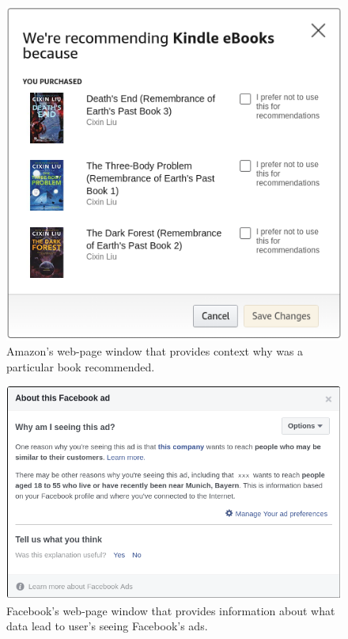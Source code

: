 \begin{figure}[htbp]
    \centering
    \includegraphics[scale=0.5]{img/AmazonExplanation.png}
    \caption{Amazon's web-page window that provides context why was a particular book recommended.}
    \label{fig:amazon_explain_book_recommendation}
\end{figure}

\begin{figure}[htbp]
    \centering
    \includegraphics[scale=0.5]{img/FacebookAdExplanation2.png}
    \caption{Facebook's web-page window that provides information about what data lead to user's seeing Facebook's ads.}
    \label{fig:facebook_explain_book_recommendation}
\end{figure}

